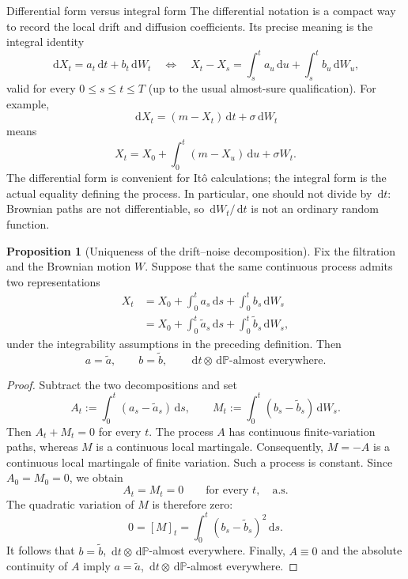 \documentclass[10pt]{article}
\newcommand{\Pp}{\mathbb P}
\newcommand{\1}{\mathbf 1}
\newcommand{\dd}{\,\mathrm d}
\theoremstyle{definition}
\newtheorem{proposition}[definition]{Proposition}
\begin{document}
\begin{keyidea}{Differential form versus integral form}
The differential notation is a compact way to record the local drift and
diffusion coefficients. Its precise meaning is the integral identity
\[
\boxed{
\dd X_t=a_t\dd t+b_t\dd W_t
\quad\Longleftrightarrow\quad
X_t-X_s=\int_s^t a_u\dd u+\int_s^t b_u\dd W_u,}
\]
valid for every \(0\leq s\leq t\leq T\) (up to the usual almost-sure
qualification). For example,
\[
\dd X_t=(m-X_t)\dd t+\sigma\dd W_t
\]
means
\[
X_t=X_0+\int_0^t(m-X_u)\dd u+\sigma W_t.
\]
The differential form is convenient for It\^o calculations; the integral
form is the actual equality defining the process. In particular, one should
not divide by \(\dd t\): Brownian paths are not differentiable, so
\(\dd W_t/\dd t\) is not an ordinary random function.
\end{keyidea}

\begin{proposition}[Uniqueness of the drift--noise decomposition]
Fix the filtration and the Brownian motion \(W\). Suppose that the same
continuous process admits two representations
\[
\begin{aligned}
X_t
&=X_0+\int_0^t a_s\dd s+\int_0^t b_s\dd W_s\\
&=X_0+\int_0^t\widetilde a_s\dd s
       +\int_0^t\widetilde b_s\dd W_s,
\end{aligned}
\]
under the integrability assumptions in the preceding definition. Then
\[
\boxed{
a=\widetilde a,\qquad b=\widetilde b,
\qquad \dd t\otimes\dd\Pp\text{-almost everywhere}.}
\]
\end{proposition}

\begin{proof}
Subtract the two decompositions and set
\[
A_t:=\int_0^t(a_s-\widetilde a_s)\dd s,
\qquad
M_t:=\int_0^t(b_s-\widetilde b_s)\dd W_s.
\]
Then \(A_t+M_t=0\) for every \(t\). The process \(A\) has continuous
finite-variation paths, whereas \(M\) is a continuous local martingale.
Consequently, \(M=-A\) is a continuous local martingale of finite variation.
Such a process is constant. Since \(A_0=M_0=0\), we obtain
\[
A_t=M_t=0
\qquad\text{for every }t,\quad\text{a.s.}
\]
The quadratic variation of \(M\) is therefore zero:
\[
0=[M]_t
=\int_0^t(b_s-\widetilde b_s)^2\dd s.
\]
It follows that \(b=\widetilde b\),
\(\dd t\otimes\dd\Pp\)-almost everywhere. Finally, \(A\equiv0\) and the
absolute continuity of \(A\) imply
\(a=\widetilde a\), \(\dd t\otimes\dd\Pp\)-almost everywhere.
\end{proof}
\end{document}
